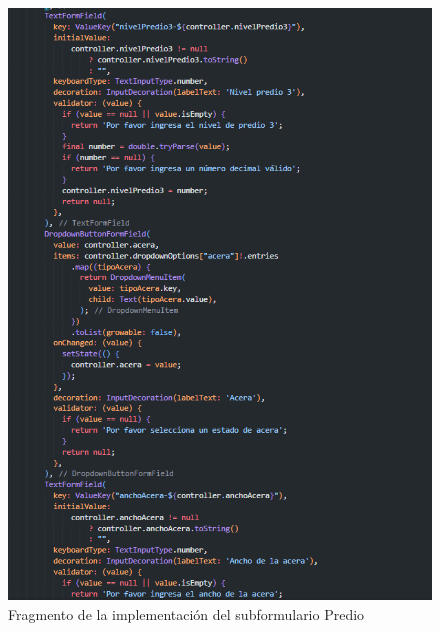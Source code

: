 \begin{figure}[h]
    \centering
    \includegraphics[scale=0.5]{Graphics/Capitulo 3/formulario_predio.png}
    \caption{Fragmento de la implementación del subformulario Predio} %
    \label{fig:figura16}
\end{figure}


